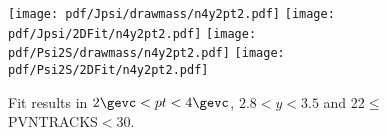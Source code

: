 \begin{figure}[H]
\begin{center}
\texttt{[image: pdf/Jpsi/drawmass/n4y2pt2.pdf]}
\texttt{[image: pdf/Jpsi/2DFit/n4y2pt2.pdf]}
\vspace*{-0.5cm}
\texttt{[image: pdf/Psi2S/drawmass/n4y2pt2.pdf]}
\texttt{[image: pdf/Psi2S/2DFit/n4y2pt2.pdf]}
\vspace*{-0.5cm}
\end{center}
\caption{Fit results in $2\gevc<pt<4\gevc$, $2.8<y<3.5$ and 22$\leq$PVNTRACKS$<$30.}
\label{Fitn4y2pt2}
\end{figure}
